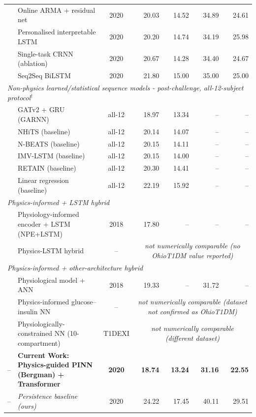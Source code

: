 \documentclass[journal]{IEEEtran}
\begin{document}
\begin{table}[t]
\begin{tabular}{lp{3.2cm}crrrr}
\cite{ref72} & Online ARMA + residual net & 2020 & 20.03 & 14.52 & 34.89 & 24.61 \\
\cite{ref73} & Personalised interpretable LSTM & 2020 & 20.20 & 14.74 & 34.19 & 25.98 \\
\cite{ref71} & Single-task CRNN (ablation) & 2020 & 20.67 & 14.28 & 34.40 & 24.67 \\
\cite{ref74} & Seq2Seq BiLSTM & 2020 & 21.80 & 15.00 & 35.00 & 25.00 \\
\multicolumn{7}{l}{\textit{Non-physics learned/statistical sequence models - post-challenge, all-12-subject protocol$^{\dagger}$}} \\
\cite{ref75} & GATv2 + GRU (GARNN) & all-12 & 18.97 & 13.34 & -- & -- \\
\cite{ref75} & NHiTS (baseline) & all-12 & 20.14 & 14.07 & -- & -- \\
\cite{ref75} & N-BEATS (baseline) & all-12 & 20.15 & 14.11 & -- & -- \\
\cite{ref75} & IMV-LSTM (baseline) & all-12 & 20.15 & 14.00 & -- & -- \\
\cite{ref75} & RETAIN (baseline) & all-12 & 20.30 & 14.41 & -- & -- \\
\cite{ref75} & Linear regression (baseline) & all-12 & 22.19 & 15.92 & -- & -- \\
\midrule
\multicolumn{7}{l}{\textit{Physics-informed + LSTM hybrid}} \\
\cite{ref59} & Physiology-informed encoder + LSTM (NPE+LSTM) & 2018 & 17.80 & -- & -- & -- \\
\cite{ref12} & Physics-LSTM hybrid & -- & \multicolumn{4}{c}{\textit{not numerically comparable (no OhioT1DM value reported)}} \\
\midrule
\multicolumn{7}{l}{\textit{Physics-informed + other-architecture hybrid}} \\
\cite{ref58} & Physiological model + ANN & 2018 & 19.33 & -- & 31.72 & -- \\
\cite{ref11} & Physics-informed glucose--insulin NN & -- & \multicolumn{4}{c}{\textit{not numerically comparable (dataset not confirmed as OhioT1DM)}} \\
\cite{ref16} & Physiologically-constrained NN (10-compartment) & T1DEXI & \multicolumn{4}{c}{\textit{not numerically comparable (different dataset)}} \\
-- & \textbf{Current Work: Physics-guided PINN (Bergman) + Transformer} & \textbf{2020} & \textbf{18.74} & \textbf{13.24} & \textbf{31.16} & \textbf{22.55} \\
-- & \emph{Persistence baseline (ours)} & 2020 & 24.22 & 17.45 & 40.11 & 29.51 \\
\bottomrule
\end{tabular}


\end{table}
\end{document}
